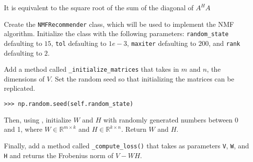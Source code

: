 It is equivalent to the square root of the sum of the diagonal of $A^{H}A$



\begin{problem}
Create the \texttt{NMFRecommender} class, which will be used to implement the NMF algorithm.
Initialize the class with the following parameters: 
\texttt{random\_state} defaulting to $15$,
\texttt{tol} defaulting to $1e-3$, \texttt{maxiter} defaulting to $200$, and \texttt{rank} defaulting to $2$.


Add a method called \texttt{\_initialize\_matrices} that takes in $m$ and $n$, the dimensions of $V$.
Set the random seed so that initializing the matrices can be replicated.
\begin{lstlisting}
>>> np.random.seed(self.random_state) 
\end{lstlisting}
Then, using , initialize $W$ and $H$ with randomly generated numbers between 0 and 1, where $W\in\mathbb{R}^{m\times k}$ and $H\in\mathbb{R}^{k\times n}$.
Return $W$ and $H$.

Finally, add a method called \texttt{\_compute\_loss()} that takes as parameters \texttt{V}, \texttt{W}, and \texttt{H} and returns the Frobenius norm of $V-WH$.
\end{problem}

%
%
%




